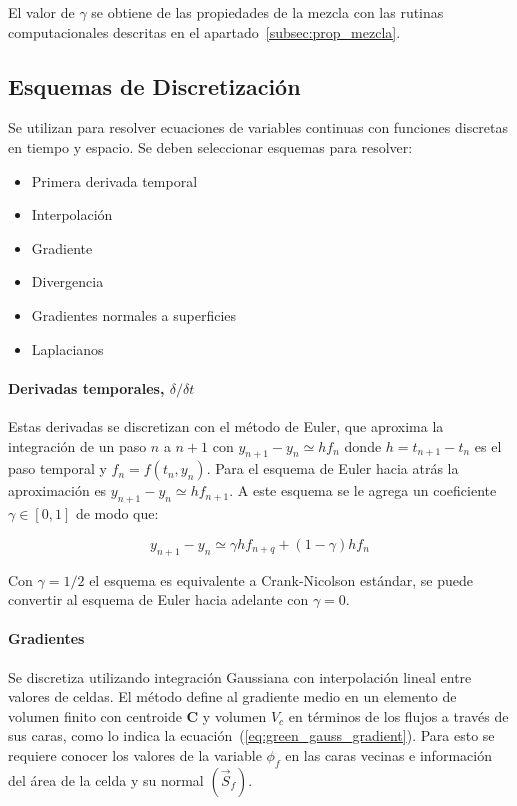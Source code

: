 El valor de $\gamma$ se obtiene de las propiedades de la mezcla con las rutinas
computacionales descritas en el apartado~\ref{subsec:prop_mezcla}.

\subsection{Esquemas de Discretización}

Se utilizan para resolver ecuaciones de variables continuas con funciones
discretas en tiempo y espacio.
%
Se deben seleccionar esquemas para resolver:

\begin{itemize}
  \item Primera derivada temporal
  \item Interpolación
  \item Gradiente
  \item Divergencia
  \item Gradientes normales a superficies
  \item Laplacianos
\end{itemize}


\paragraph{Derivadas temporales, $\delta / \delta t$}
%
Estas derivadas se discretizan con el método de Euler\parencite{burden}, que
aproxima la integración de un paso $n$ a $n+1$ con $y_{n+1}-y_{n}\simeq hf_{n}$
donde $h = t_{n+1}-t_{n}$ es el paso temporal y $f_{n}=f(t_{n},y_{n})$.
%
Para el esquema de Euler hacia atrás la aproximación es
$y_{n+1}-y_{n}\simeq h f_{n+1}$.
%
A este esquema se le agrega un coeficiente $\gamma\in[0,1]$ de modo que:

\begin{equation}
  y_{n+1}-y_{n} \simeq \gamma h f_{n+q} + (1-\gamma)h f_{n}
\end{equation}

Con $\gamma=1/2$ el esquema es equivalente a Crank-Nicolson estándar, se puede
convertir al esquema de Euler hacia adelante con $\gamma=0$.

\paragraph{Gradientes}
%
Se discretiza utilizando integración Gaussiana con interpolación lineal entre
valores de celdas.
%
El método define al gradiente medio en un elemento de volumen finito con
centroide \textbf{C} y volumen $V_{c}$ en términos de los flujos a través de sus
caras, como lo indica la ecuación~(\ref{eq:green_gauss_gradient}).
%
Para esto se requiere conocer los valores de la variable $\phi_{f}$ en las caras
vecinas e información del área de la celda y su normal $(\vec{S}_{f})$.

